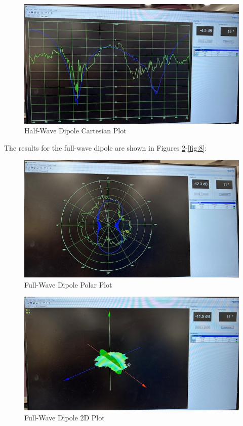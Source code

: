 \documentclass[
	letterpaper, %
	10pt, %
]{CSUniSchoolLabReport}
\begin{document}
\begin{figure}[H]
  \centering
  \includegraphics[width=.8\textwidth]{Figures/Lab Five/HWD-XY.jpg}
  \caption{Half-Wave Dipole Cartesian Plot}
  \label{fig:4}
\end{figure}

The results for the full-wave dipole are shown in Figures \ref{fig:5}-\ref{fig:8}:

\begin{figure}[H]
  \centering
  \includegraphics[width=.8\textwidth]{Figures/Lab Five/FWD-Polar.jpg}
  \caption{Full-Wave Dipole Polar Plot}
  \label{fig:5}
\end{figure}

\begin{figure}[H]
  \centering
  \includegraphics[width=.8\textwidth]{Figures/Lab Five/FWD-2D.jpg}
  \caption{Full-Wave Dipole 2D Plot}
  \label{fig:6}
\end{figure}
\end{document}
